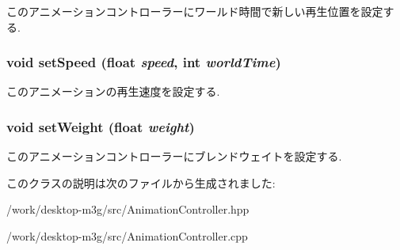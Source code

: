 このアニメーションコントローラーにワールド時間で新しい再生位置を設定する. \hypertarget{classm3g_1_1AnimationController_403dae9658751ff86becd82d8a6477f2}{
\subsubsection[{setSpeed}]{\setlength{\rightskip}{0pt plus 5cm}void setSpeed (float {\em speed}, \/  int {\em worldTime})}}
\label{classm3g_1_1AnimationController_403dae9658751ff86becd82d8a6477f2}


このアニメーションの再生速度を設定する. \hypertarget{classm3g_1_1AnimationController_8859df4d5a61714012bf9e1240189aed}{
\subsubsection[{setWeight}]{\setlength{\rightskip}{0pt plus 5cm}void setWeight (float {\em weight})}}
\label{classm3g_1_1AnimationController_8859df4d5a61714012bf9e1240189aed}


このアニメーションコントローラーにブレンドウェイトを設定する. 

このクラスの説明は次のファイルから生成されました:\begin{CompactItemize}
\item 
/work/desktop-m3g/src/AnimationController.hpp\item 
/work/desktop-m3g/src/AnimationController.cpp\end{CompactItemize}
